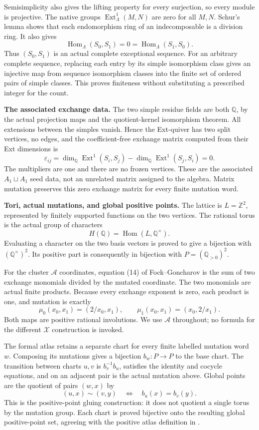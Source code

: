 \documentclass[10pt,a4paper]{article}
\begin{document}
Semisimplicity also gives the lifting property for every surjection,
so every module is projective. The native groups
$\operatorname{Ext}^1_\Lambda(M,N)$ are zero for all $M,N$.
Schur's lemma shows that each endomorphism ring of an indecomposable is
a division ring. It also gives
\[
 \operatorname{Hom}_\Lambda(S_0,S_1)=0=
 \operatorname{Hom}_\Lambda(S_1,S_0).
\]
Thus $(S_0,S_1)$ is an actual complete exceptional sequence.
For an arbitrary complete sequence, replacing each entry by its simple
isomorphism class gives an injective map from sequence isomorphism classes
into the finite set of ordered pairs of simple classes. This proves
finiteness without substituting a prescribed integer for the count.

\newpage
\textbf{The associated exchange data.}
The two simple residue fields are both $\mathbb Q$, by the actual projection
maps and the quotient-kernel isomorphism theorem. All extensions between
the simples vanish. Hence the Ext-quiver has two split vertices, no edges,
and the coefficient-free exchange matrix computed from their Ext dimensions is
\[
 \varepsilon_{ij}=
 \dim_\mathbb Q\operatorname{Ext}^1(S_i,S_j)
 -\dim_\mathbb Q\operatorname{Ext}^1(S_j,S_i)=0.
\]
The multipliers are one and there are no frozen vertices. These are the
associated $A_1\sqcup A_1$ seed data, not an unrelated matrix assigned to the
algebra. Matrix mutation preserves this zero exchange matrix for every
finite mutation word.

\textbf{Tori, actual mutations, and global positive points.}
The lattice is $L=\mathbb Z^2$, represented by finitely supported functions
on the two vertices. The rational torus is the actual group of characters
\[
 H(\mathbb Q)=\operatorname{Hom}(L,\mathbb Q^\times).
\]
Evaluating a character on the two basis vectors is proved to give a
bijection with $(\mathbb Q^\times)^2$. Its positive part is consequently
in bijection with $P=(\mathbb Q_{>0})^2$.

For the cluster $\mathcal A$ coordinates, equation (14) of
Fock--Goncharov is the sum of two exchange monomials divided by the
mutated coordinate. The two monomials are actual finite products.
Because every exchange exponent is zero, each product is one, and
mutation is exactly
\[
 \mu_0(x_0,x_1)=(2/x_0,x_1),\qquad
 \mu_1(x_0,x_1)=(x_0,2/x_1).
\]
Both maps are positive rational involutions. We use $\mathcal A$ throughout;
no formula for the different $\mathcal X$ construction is invoked.

The formal atlas retains a separate chart for every finite labelled
mutation word $w$. Composing its mutations gives a bijection
$b_w:P\to P$ to the base chart. The transition between charts $u,v$ is
$b_v^{-1}b_u$, satisfies the identity and cocycle equations, and on an
adjacent pair is the actual mutation above. Global points are the quotient
of pairs $(w,x)$ by
\[
 (u,x)\sim(v,y)\quad\Longleftrightarrow\quad b_u(x)=b_v(y).
\]
This is the positive-point gluing construction: it does not quotient a
single torus by the mutation group. Each chart is proved bijective onto
the resulting global positive-point set, agreeing with the positive atlas
definition in \cite{fg}.
\end{document}
